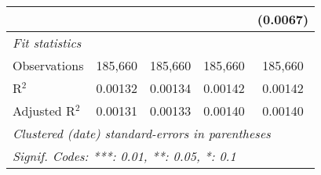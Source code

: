 \begin{table}[H]
\begin{tabular}{lcccc}
                     &                &                &               & (0.0067)\\   
      \midrule
      \emph{Fit statistics}\\
      Observations   & 185,660        & 185,660        & 185,660       & 185,660\\  
      R$^2$          & 0.00132        & 0.00134        & 0.00142       & 0.00142\\  
      Adjusted R$^2$ & 0.00131        & 0.00133        & 0.00140       & 0.00140\\  
      \midrule \midrule
      \multicolumn{5}{l}{\emph{Clustered (date) standard-errors in parentheses}}\\
      \multicolumn{5}{l}{\emph{Signif. Codes: ***: 0.01, **: 0.05, *: 0.1}}\\
   \end{tabular}
\end{table}
